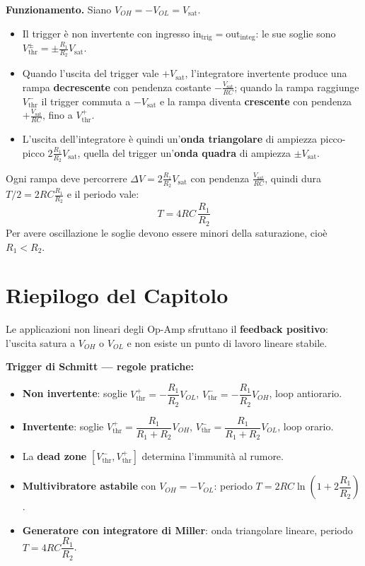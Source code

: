 \noindent\textbf{Funzionamento.} Siano $V_{OH} = -V_{OL} = V_{\text{sat}}$.
\begin{itemize}
    \item Il trigger è non invertente con ingresso $\text{in}_{\text{trig}} = \text{out}_{\text{integ}}$: le sue soglie sono $V_{\text{thr}}^\pm = \pm\frac{R_1}{R_2}V_{\text{sat}}$.
    \item Quando l'uscita del trigger vale $+V_{\text{sat}}$, l'integratore invertente produce una rampa \textbf{decrescente} con pendenza costante $-\frac{V_{\text{sat}}}{RC}$; quando la rampa raggiunge $V_{\text{thr}}^-$ il trigger commuta a $-V_{\text{sat}}$ e la rampa diventa \textbf{crescente} con pendenza $+\frac{V_{\text{sat}}}{RC}$, fino a $V_{\text{thr}}^+$.
    \item L'uscita dell'integratore è quindi un'\textbf{onda triangolare} di ampiezza picco-picco $2\frac{R_1}{R_2}V_{\text{sat}}$, quella del trigger un'\textbf{onda quadra} di ampiezza $\pm V_{\text{sat}}$.
\end{itemize}
Ogni rampa deve percorrere $\Delta V = 2\frac{R_1}{R_2}V_{\text{sat}}$ con pendenza $\frac{V_{\text{sat}}}{RC}$, quindi dura $T/2 = 2RC\frac{R_1}{R_2}$ e il periodo vale:
\[
    T = 4RC\,\frac{R_1}{R_2}
\]
Per avere oscillazione le soglie devono essere minori della saturazione, cioè $R_1 < R_2$.

\section*{Riepilogo del Capitolo}

\begin{important}
Le applicazioni non lineari degli Op-Amp sfruttano il \textbf{feedback positivo}: l'uscita satura a $V_{OH}$ o $V_{OL}$ e non esiste un punto di lavoro lineare stabile.
\end{important}

\begin{note}
\textbf{Trigger di Schmitt — regole pratiche:}
\begin{itemize}
    \item \textbf{Non invertente}: soglie $V_{\text{thr}}^+ = -\dfrac{R_1}{R_2} V_{OL}$, $V_{\text{thr}}^- = -\dfrac{R_1}{R_2} V_{OH}$, loop antiorario.
    \item \textbf{Invertente}: soglie $V_{\text{thr}}^+ = \dfrac{R_1}{R_1+R_2} V_{OH}$, $V_{\text{thr}}^- = \dfrac{R_1}{R_1+R_2} V_{OL}$, loop orario.
    \item La \textbf{dead zone} $[V_{\text{thr}}^-, V_{\text{thr}}^+]$ determina l'immunità al rumore.
    \item \textbf{Multivibratore astabile} con $V_{OH} = -V_{OL}$: periodo $T = 2RC\ln\!\left(1 + 2\dfrac{R_1}{R_2}\right)$.
    \item \textbf{Generatore con integratore di Miller}: onda triangolare lineare, periodo $T = 4RC\dfrac{R_1}{R_2}$.
\end{itemize}
\end{note}


